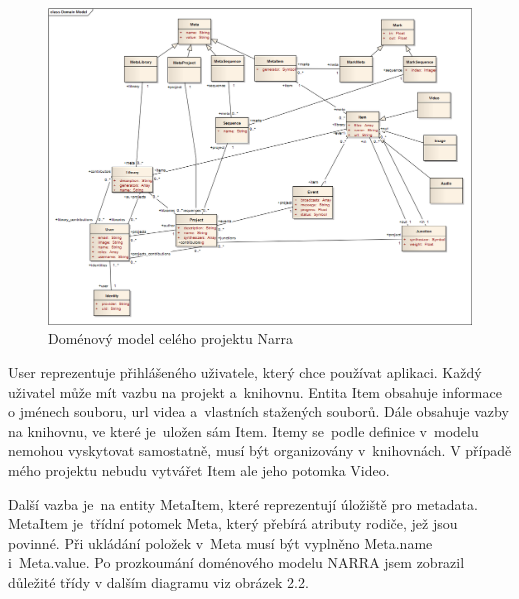 \begin{figure}[H]
\includegraphics[width=1\textwidth]{./obrazova_priloha/domain_model.png}
\caption{Doménový model celého projektu Narra}
\end{figure}

\par User reprezentuje přihlášeného uživatele, který chce používat aplikaci. Každý uživatel může mít vazbu na projekt a~knihovnu. Entita Item obsahuje informace o jménech souboru, url videa a~vlastních stažených souborů. Dále obsahuje vazby na knihovnu, ve které je~uložen sám Item. Itemy se~podle definice v~modelu nemohou vyskytovat samostatně, musí být organizovány v~knihovnách. V případě mého projektu nebudu vytvářet Item ale jeho potomka Video. 
\par Další vazba je~na entity MetaItem, které reprezentují úložiště pro metadata. MetaItem je~třídní potomek Meta, který přebírá atributy rodiče, jež jsou povinné. Při ukládání položek v~Meta musí být vyplněno Meta.name i~Meta.value. Po prozkoumání doménového modelu NARRA jsem zobrazil důležité třídy v dalším diagramu viz obrázek 2.2.

